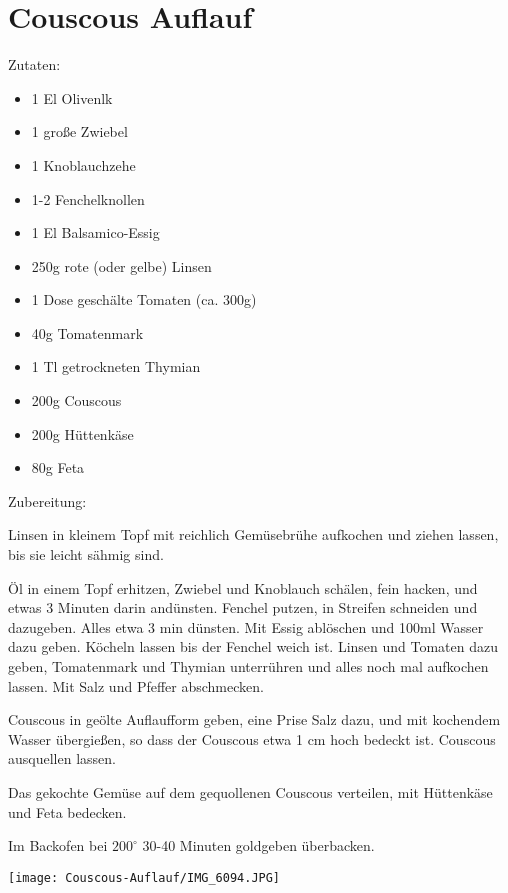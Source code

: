 \section{Couscous Auflauf}
Zutaten:
\begin{itemize}
    \item 1 El Olivenlk
    \item 1 große Zwiebel
    \item 1 Knoblauchzehe
    \item 1-2 Fenchelknollen
    \item 1 El Balsamico-Essig
    \item 250g rote (oder gelbe) Linsen
    \item 1 Dose geschälte Tomaten (ca. 300g)
    \item 40g Tomatenmark
    \item 1 Tl getrockneten Thymian
    \item 200g Couscous
    \item 200g Hüttenkäse
    \item 80g Feta
\end{itemize}

\noindent Zubereitung:

\noindent Linsen in kleinem Topf mit reichlich Gemüsebrühe aufkochen und ziehen lassen, bis sie leicht sähmig sind.

Öl in einem Topf erhitzen, Zwiebel und Knoblauch schälen, fein hacken, und etwas 3 Minuten darin andünsten. Fenchel putzen, in Streifen schneiden und dazugeben. Alles etwa 3 min dünsten. Mit Essig ablöschen und 100ml Wasser dazu geben. Köcheln lassen bis der Fenchel weich ist. Linsen und Tomaten dazu geben, Tomatenmark und Thymian unterrühren und alles noch mal aufkochen lassen. Mit Salz und Pfeffer abschmecken.

Couscous in geölte Auflaufform geben, eine Prise Salz dazu, und mit kochendem Wasser übergießen, so dass der Couscous etwa 1 cm hoch bedeckt ist. Couscous ausquellen lassen.

Das gekochte Gemüse auf dem gequollenen Couscous verteilen, mit Hüttenkäse und Feta bedecken.

Im Backofen bei $200^\circ$ 30-40 Minuten goldgeben überbacken.
\mbox{}
\vfill
\begin{center}
    \texttt{[image: Couscous-Auflauf/IMG\_6094.JPG]}
\end{center}
\vfill
\mbox{ }
\newpage
